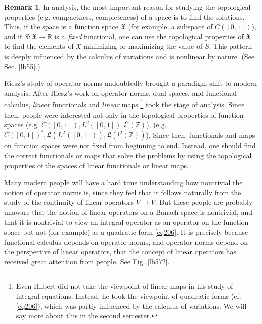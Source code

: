 \documentclass[12pt,b5paper,notitlepage]{article}
\theoremstyle{definition}
\newtheorem{rem}[df]{Remark}
\theoremstyle{plain}
\newcommand{\fk}{\mathfrak}
\newcommand{\Zbb}{\mathbb Z}
\newcommand{\Rbb}{\mathbb R}
\numberwithin{equation}{section}
\begin{document}
\begin{rem}
In analysis, the most important reason for studying the topological properties (e.g. compactness, completeness) of a space is to find the solutions. Thus, if the space is a function space $\fk X$ (for example, a subspace of $C([0,1])$), and if $S:\fk X\rightarrow \Rbb$ is a \textit{fixed} functional, one can use the topological properties of $\fk X$ to find the elements of $\fk X$ minimizing or maximizing the value of $S$. This pattern is deeply influenced by the calculus of variations and is nonlinear by nature. (See Sec. \ref{lb55}.) 

Riesz's study of operator norms undoubtedly brought a paradigm shift to modern analysis. After Riesz's work on operator norms, dual spaces, and functional calculus, \textit{linear} functionals and \textit{linear} maps \footnote{Even Hilbert did not take the viewpoint of linear maps in his study of integral equations. Instead, he took the viewpoint of quadratic forms (cf. \eqref{eq206}), which was partly influenced by the calculus of variations. We will say more about this in the second semester.} took the stage of analysis. Since then, people were interested not only in the topological properties of function spaces (e.g. $C([0,1]),L^2([0,1]),l^2(\Zbb)$),  (e.g. $C([0,1])^*,\fk L(L^2([0,1])),\fk L(l^2(\Zbb))$). Since then, functionals and maps on function spaces were not fixed from beginning to end. Instead, one should find the correct functionals or maps that solve the problems by using the topological properties of the spaces of linear functionals or linear maps. \hfill\qedsymbol
\end{rem}

 

Many modern people will have a hard time understanding how nontrivial the notion of operator norms is, since they feel that it follows naturally from the study of the continuity of linear operators $V\rightarrow V$. But these people are probably unaware that the notion of linear operators on a Banach space is nontrivial, and that it is nontrivial to view an integral operator as an operator on the function space but not (for example) as a quadratic form \eqref{eq206}. It is precisely because functional calculus depends on operator norms, and operator norms depend on the perspective of linear operators, that the concept of linear operators has received great attention from people. See Fig. \ref{lb572}.
\end{document}
